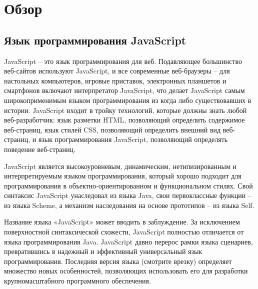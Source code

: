 \chapter{Обзор}

\section{Язык программирования JavaScript}

JavaScript -- это язык программирования для веб. Подавляющее большинство веб-сайтов используют JavaScript, и все современные веб-браузеры -- для настольных компьютеров, игровые приставок, электронных планшетов и смартфонов включают интерпретатор JavaScript, что делает JavaScript самым широкоприменимым языком программирования из когда либо существовавших в истории. JavaScript входит в тройку технологий, которые должны знать  любой веб-разработчик: язык разметки HTML, позволяющий определить содержимое веб-страниц, язык стилей CSS, позволяющий определить внешний вид веб-страниц, и язык программирования JavaScript, позволяющий определять поведение веб-страниц.

JavaScript является высокоуровневым, динамическим, нетипизированным и интерпретируемым языком программирования, который хорошо подходит для программирования в объектно-ориентированном и функциональном стилях. Свой синтаксис JavaScript унаследовал из языка Java, свои первоклассные функции -- из языка Scheme, а механизм наследования на основе прототипов -- из языка Self. 

Название языка «JavaScript» может вводить в заблуждение. За исключением поверхностной синтаксической схожести, JavaScript полностью отличается от языка программирования Java. JavaScript давно перерос рамки языка сценариев, превратившись в надежный и эффективный универсальный язык программирования. Последняя версия языка (смотрите врезку) определяет множество новых особенностей, позволяющих использовать его для разработки крупномасштабного программного обеспечения.
\cite{JsDef6}

